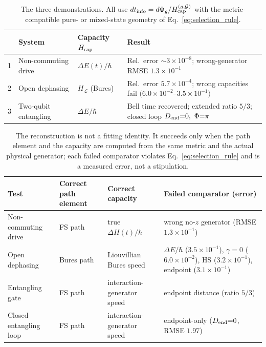 \documentclass[12pt]{article}
\begin{document}
\begin{table}[t]
\centering
\caption{The three demonstrations. All use \(dt_{\rm info}=d\Phi_g/H_{\rm cap}^{(g,\mathcal G)}\) with the metric-compatible pure- or mixed-state geometry of Eq.~\eqref{eq:selection_rule}.}
\label{tab:summary}
\small
\begin{tabular}{@{}c l l p{6.0cm}@{}}
\toprule
 & System & Capacity \(H_{\rm cap}\) & Result \\
\midrule
1 & Non-commuting drive & \(\Delta E(t)/\hbar\) & Rel.\ error \(\sim\!3\times10^{-8}\); wrong-generator RMSE \(1.3\times10^{-1}\) \\
2 & Open dephasing & \(H_{\mathcal L}\) (Bures) & Rel.\ error \(5.7\times10^{-4}\); wrong capacities fail \((6.0\times10^{-2}\)--\(3.5\times10^{-1})\) \\
3 & Two-qubit entangling & \(\Delta E/\hbar\) & Bell time recovered; extended ratio \(5/3\); closed loop \(D_{\rm end}{=}0,\ \Phi{=}\pi\) \\
\bottomrule
\end{tabular}
\end{table}

\begin{table}[t]
\centering
\caption{The reconstruction is not a fitting identity. It succeeds only when the path element and the capacity are computed from the same metric and the actual physical generator; each failed comparator violates Eq.~\eqref{eq:selection_rule} and is a measured error, not a stipulation.}
\label{tab:selection}
\footnotesize
\begin{tabular}{@{}p{2.6cm} p{2.2cm} p{2.7cm} p{5.4cm}@{}}
\toprule
Test & Correct path element & Correct capacity & Failed comparator (error) \\
\midrule
Non-commuting drive & FS path & true \(\Delta H(t)/\hbar\) & wrong no-\(z\) generator (RMSE \(1.3\times10^{-1}\)) \\
Open dephasing & Bures path & Liouvillian Bures speed & \(\Delta E/\hbar\) (\(3.5\times10^{-1}\)), \(\gamma{=}0\) (\(6.0\times10^{-2}\)), HS (\(3.2\times10^{-1}\)), endpoint (\(3.1\times10^{-1}\)) \\
Entangling gate & FS path & interaction-generator speed & endpoint distance (ratio \(5/3\)) \\
Closed entangling loop & FS path & interaction-generator speed & endpoint-only (\(D_{\rm end}{=}0\), RMSE \(1.97\)) \\
\bottomrule
\end{tabular}
\end{table}
\end{document}
